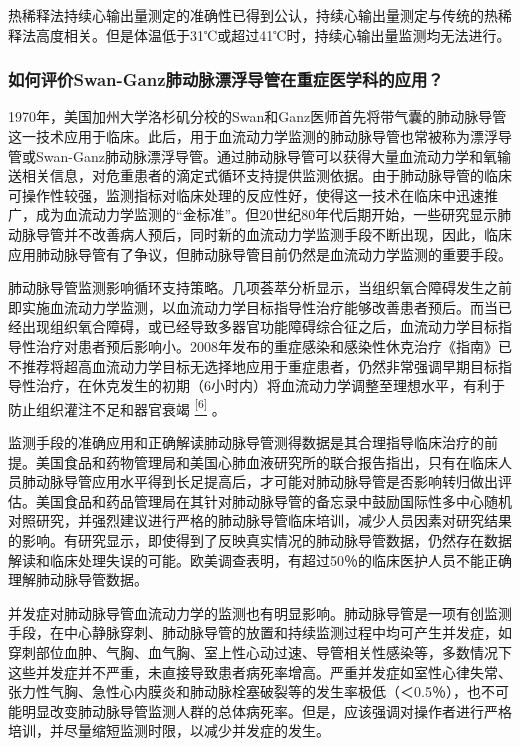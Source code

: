热稀释法持续心输出量测定的准确性已得到公认，持续心输出量测定与传统的热稀释法高度相关。但是体温低于31℃或超过41℃时，持续心输出量监测均无法进行。

\subsubsection{如何评价Swan-Ganz肺动脉漂浮导管在重症医学科的应用？}

1970年，美国加州大学洛杉矶分校的Swan和Ganz医师首先将带气囊的肺动脉导管这一技术应用于临床。此后，用于血流动力学监测的肺动脉导管也常被称为漂浮导管或Swan-Ganz肺动脉漂浮导管。通过肺动脉导管可以获得大量血流动力学和氧输送相关信息，对危重患者的滴定式循环支持提供监测依据。由于肺动脉导管的临床可操作性较强，监测指标对临床处理的反应性好，使得这一技术在临床中迅速推广，成为血流动力学监测的“金标准”。但20世纪80年代后期开始，一些研究显示肺动脉导管并不改善病人预后，同时新的血流动力学监测手段不断出现，因此，临床应用肺动脉导管有了争议，但肺动脉导管目前仍然是血流动力学监测的重要手段。

肺动脉导管监测影响循环支持策略。几项荟萃分析显示，当组织氧合障碍发生之前即实施血流动力学监测，以血流动力学目标指导性治疗能够改善患者预后。而当已经出现组织氧合障碍，或已经导致多器官功能障碍综合征之后，血流动力学目标指导性治疗对患者预后影响小。2008年发布的重症感染和感染性休克治疗《指南》已不推荐将超高血流动力学目标无选择地应用于重症患者，仍然非常强调早期目标指导性治疗，在休克发生的初期（6小时内）将血流动力学调整至理想水平，有利于防止组织灌注不足和器官衰竭
\protect\hyperlink{text00010.htmlux5cux23ch6-9}{\textsuperscript{{[}6{]}}}
。

监测手段的准确应用和正确解读肺动脉导管测得数据是其合理指导临床治疗的前提。美国食品和药物管理局和美国心肺血液研究所的联合报告指出，只有在临床人员肺动脉导管应用水平得到长足提高后，才可能对肺动脉导管是否影响转归做出评估。美国食品和药品管理局在其针对肺动脉导管的备忘录中鼓励国际性多中心随机对照研究，并强烈建议进行严格的肺动脉导管临床培训，减少人员因素对研究结果的影响。有研究显示，即使得到了反映真实情况的肺动脉导管数据，仍然存在数据解读和临床处理失误的可能。欧美调查表明，有超过50％的临床医护人员不能正确理解肺动脉导管数据。

并发症对肺动脉导管血流动力学的监测也有明显影响。肺动脉导管是一项有创监测手段，在中心静脉穿刺、肺动脉导管的放置和持续监测过程中均可产生并发症，如穿刺部位血肿、气胸、血气胸、室上性心动过速、导管相关性感染等，多数情况下这些并发症并不严重，未直接导致患者病死率增高。严重并发症如室性心律失常、张力性气胸、急性心内膜炎和肺动脉栓塞破裂等的发生率极低（＜0.5％），也不可能明显改变肺动脉导管监测人群的总体病死率。但是，应该强调对操作者进行严格培训，并尽量缩短监测时限，以减少并发症的发生。

